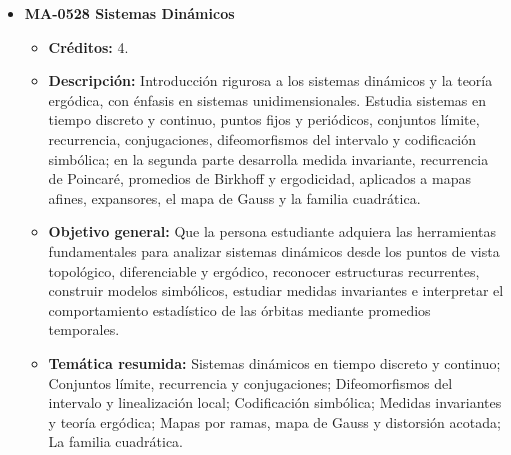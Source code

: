 \begin{itemize}[leftmargin=1.3em, itemsep=10pt, topsep=4pt, label={\color{Azul-UCR}$\blacksquare$}]
\item {\color{Azul-UCR}\textbf{MA-0528 Sistemas Dinámicos}}\par\nopagebreak\smallskip
\begin{itemize}[leftmargin=1.1em, itemsep=3pt, topsep=2pt, parsep=2pt, label={\textendash}]
\item \textbf{Créditos:} 4.
\item \textbf{Descripción:} Introducción rigurosa a los sistemas dinámicos y la teoría ergódica, con énfasis en sistemas unidimensionales. Estudia sistemas en tiempo discreto y continuo, puntos fijos y periódicos, conjuntos límite, recurrencia, conjugaciones, difeomorfismos del intervalo y codificación simbólica; en la segunda parte desarrolla medida invariante, recurrencia de Poincaré, promedios de Birkhoff y ergodicidad, aplicados a mapas afines, expansores, el mapa de Gauss y la familia cuadrática.
\item \textbf{Objetivo general:} Que la persona estudiante adquiera las herramientas fundamentales para analizar sistemas dinámicos desde los puntos de vista topológico, diferenciable y ergódico, reconocer estructuras recurrentes, construir modelos simbólicos, estudiar medidas invariantes e interpretar el comportamiento estadístico de las órbitas mediante promedios temporales.
\item \textbf{Temática resumida:} Sistemas dinámicos en tiempo discreto y continuo; Conjuntos límite, recurrencia y conjugaciones; Difeomorfismos del intervalo y linealización local; Codificación simbólica; Medidas invariantes y teoría ergódica; Mapas por ramas, mapa de Gauss y distorsión acotada; La familia cuadrática.
\end{itemize}


\end{itemize}
